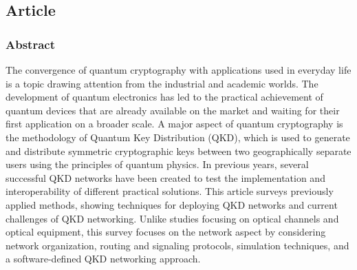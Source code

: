 \subsection{Article}

\subsubsection*{Abstract}
The convergence of quantum cryptography with applications used in everyday life is a topic drawing attention from the industrial and academic worlds. The development of quantum electronics has led to the practical achievement of quantum devices that are already available on the market and waiting for their first application on a broader scale. A major aspect of quantum cryptography is the methodology of Quantum Key Distribution (QKD), which is used to generate and distribute symmetric cryptographic keys between two geographically separate users using the principles of quantum physics. In previous years, several successful QKD networks have been created to test the implementation and interoperability of different practical solutions. This article surveys previously applied methods, showing techniques for deploying QKD networks and current challenges of QKD networking. Unlike studies focusing on optical channels and optical equipment, this survey focuses on the network aspect by considering network organization, routing and signaling protocols, simulation techniques, and a software-defined QKD networking approach.


